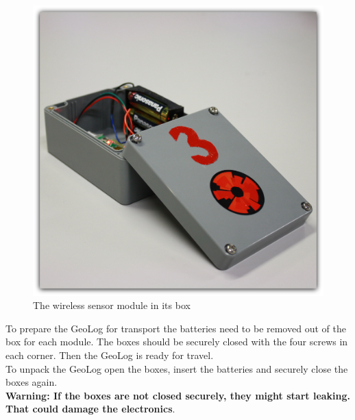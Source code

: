 \begin{figure}[H]
\centering
\includegraphics[width=0.6\linewidth]{graphics/Wixel_sensor.jpg}
\caption{The wireless sensor module in its box\label{fig:Wixel_sensor}}
\end{figure}
To prepare the GeoLog for transport the batteries need to be removed out of the box for each module. The boxes should be securely closed with the four screws in each corner. Then the GeoLog is ready for travel.\\
To unpack the GeoLog open the boxes, insert the batteries and securely close the boxes again.\\
\textbf{Warning: If the boxes are not closed securely, they might start leaking. That could damage the electronics}.

